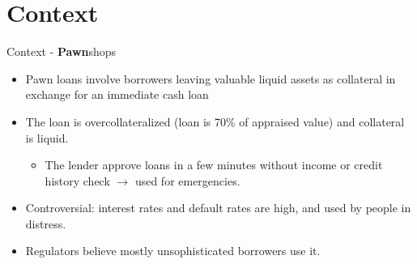 \documentclass[8pt]{beamer}
\begin{document}
\section{Context}
\begin{frame}{Context - \textbf{Pawn}shops}
\begin{itemize}
    \vfill \item Pawn loans involve borrowers leaving valuable liquid assets as collateral in exchange for an immediate cash loan
    \vfill \pause \item The loan is overcollateralized (loan is 70\% of appraised value) and collateral is liquid.
    \begin{itemize}
        \item The lender approve loans in a few minutes without income or credit history check $\rightarrow$ used for emergencies.
    \end{itemize}

    \vfill \pause \item Controversial: interest rates and default rates are high, and used by people in distress.
    \vfill \pause \item Regulators believe mostly unsophisticated borrowers use it.
\end{itemize}
\end{frame}
\end{document}
